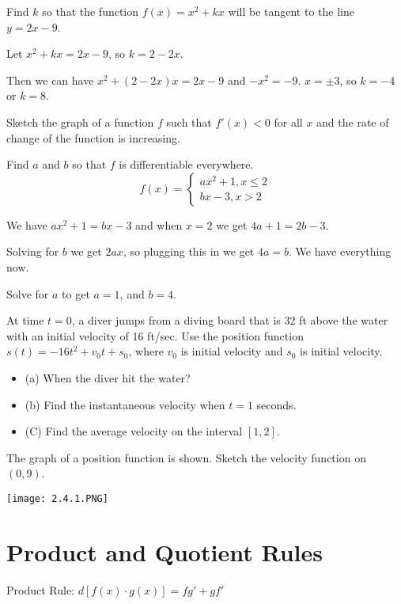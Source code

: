 \documentclass[../bccalc.tex]{subfiles}
\begin{document}
\pagebreak
\begin{example}
    Find $k$ so that the function $f(x)=x^2+kx$ will be tangent to the line $y=2x-9$.

    Let $x^2+kx=2x-9$, so $k=2-2x$.

    Then we can have $x^2+(2-2x)x=2x-9$ and $-x^2=-9$. $x=\pm 3$, so $k=-4$ or $k=8$.
\end{example}

\ex Sketch the graph of a function $f$ such that $f'(x)<0$ for all $x$ and the rate of change of the function is increasing.

\begin{example}
    Find $a$ and $b$ so that $f$ is differentiable everywhere.
    \[ f(x)=\begin{cases}
        ax^2+1, x\leq 2 \\ bx-3, x>2
    \end{cases} \]

    We have $ax^2+1=bx-3$ and when $x=2$ we get $4a+1=2b-3$.

    Solving for $b$ we get $2ax$, so plugging this in we get $4a=b$. We have everything now.

    Solve for $a$ to get $a=1$, and $b=4$.
\end{example}

\ex At time $t=0$, a diver jumps from a diving board that is 32 ft above the water with an initial velocity of 16 ft/sec. Use the position function $s(t)=-16t^2+v_0t+s_0$, where $v_0$ is initial velocity and $s_0$ is initial velocity. \begin{itemize}
    \item (a) When the diver hit the water?
    \item (b) Find the instantaneous velocity when $t=1$ seconds.
    \item (C) Find the average velocity on the interval $[1,2]$.
\end{itemize}

\ex The graph of a position function is shown. Sketch the velocity function on $(0,9)$.
\begin{center}
    \texttt{[image: 2.4.1.PNG]}
\end{center}

\pagebreak
\section{Product and Quotient Rules}
Product Rule: $d[f(x)\cdot g(x)] = fg'+gf'$
\end{document}
